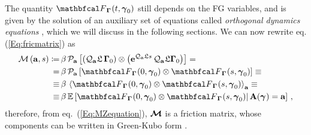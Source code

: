 \documentclass[10pt,a4paper]{book}
\theoremstyle{definition}
\begin{document}
The quantity $\fprojbf_{\Bphase{}}(t,\Aphase{0})$ still depends on the FG variables, and is given by the solution of an auxiliary set of equations called \emph{orthogonal dynamics equations} \cite{Givon2005}, which we will discuss in the following sections.  
We can now rewrite eq. (\ref{Eq:fricmatrix}) as
\begin{align}\label{Eq:FRICmatrixRF}
 \nonumber
 \fricmat\cip{\bfa,s} \coloneqq& 
   \,\beta\,\pproj_{\bfa}\sqp{ \cip{ \qproj_{\bfa}\Lio\,\Bphase{0}} \otimes 
   \cip{ \exp{\qproj_{\bfa}\Lio s}\,\qproj_{\bfa}\Lio\Bphase{0} } } = {}\\ 
 \nonumber
 =& \,\beta\, \pproj_{\bfa} \sqp{ \fprojbf_{\Bphase{}}(0,\Aphase{0}) \otimes \fprojbf_{\Bphase{}}(s,\Aphase{0}) } \equiv{}\\
 \nonumber
 \equiv& \,\beta\, \aver{ \fprojbf_{\Bphase{}}(0,\Aphase{0}) \otimes \fprojbf_{\Bphase{}}(s,\Aphase{0}) }_{\bfa} \equiv{}\\
 \equiv& \,\beta\, \cexpval{ \fprojbf_{\Bphase{}}(0,\Aphase{0}) \otimes \fprojbf_{\Bphase{}}(s,\Aphase{0}) }{ \,\bfA(\Aphase{})=\bfa }\,,
\end{align}
therefore, from eq.~(\ref{Eq:MZequation}), $\boldsymbol{\mathcal{M}}$ is a friction matrix, whose components can be written in Green-Kubo form \cite{Kauzlaric2011}.
\end{document}
